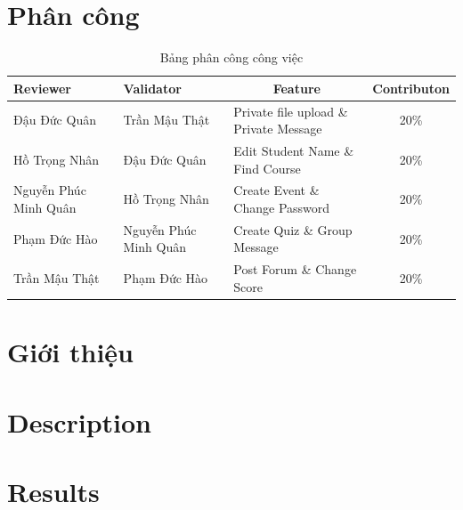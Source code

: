\documentclass[a4paper, 12pt]{article}
\begin{document}
\newpage
\tableofcontents
\newpage

\section{Phân công}
\begin{table}[H]
    \centering
    \begin{longtable}{|p{3cm}|p{3cm}|l|c|}
    \hline 
    Reviewer &
    Validator &
      \multicolumn{1}{c|}{Feature} &Contributon \\ \hline
    Đậu Đức Quân & Trần Mậu Thật & Private file upload \& Private Message& 20\%\\\hline
    Hồ Trọng Nhân & Đậu Đức Quân & Edit Student Name \& Find Course & 20\%\\ \hline
    Nguyễn Phúc Minh Quân & Hồ Trọng Nhân &Create Event \& Change Password&20\%\\ \hline
    Phạm Đức Hào & Nguyễn Phúc Minh Quân & Create Quiz \& Group Message &20\%\\ \hline
    Trần Mậu Thật & Phạm Đức Hào & Post Forum \& Change Score&20\%\\ \hline
    \end{longtable}
    \caption{Bảng phân công công việc}
    \label{tab:my-table}
    \end{table}

\newpage

\section{Giới thiệu}


\section{Description}










\section{Results}










\end{document}
